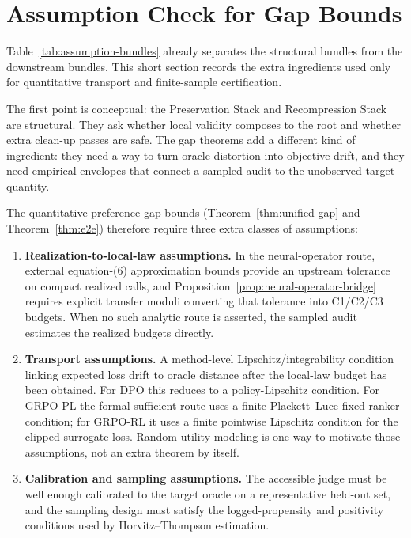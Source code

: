 \section{Assumption Check for Gap Bounds}\label{sec:verification}

Table~\ref{tab:assumption-bundles} already separates the structural bundles from the downstream bundles. This short section records the extra ingredients used only for quantitative transport and finite-sample certification.

The first point is conceptual: the Preservation Stack and Recompression Stack are structural. They ask whether local validity composes to the root and whether extra clean-up passes are safe. The gap theorems add a different kind of ingredient: they need a way to turn oracle distortion into objective drift, and they need empirical envelopes that connect a sampled audit to the unobserved target quantity.

The quantitative preference-gap bounds (Theorem~\ref{thm:unified-gap} and Theorem~\ref{thm:e2e}) therefore require three extra classes of assumptions:
\begin{enumerate}[leftmargin=1.5em]
    \item \textbf{Realization-to-local-law assumptions.} In the neural-operator route, external equation-(6) approximation bounds provide an upstream tolerance on compact realized calls, and Proposition~\ref{prop:neural-operator-bridge} requires explicit transfer moduli converting that tolerance into C1/C2/C3 budgets. When no such analytic route is asserted, the sampled audit estimates the realized budgets directly.
    \item \textbf{Transport assumptions.} A method-level Lipschitz/integrability condition linking expected loss drift to oracle distance after the local-law budget has been obtained. For DPO this reduces to a policy-Lipschitz condition. For GRPO-PL the formal sufficient route uses a finite Plackett--Luce fixed-ranker condition; for GRPO-RL it uses a finite pointwise Lipschitz condition for the clipped-surrogate loss. Random-utility modeling \citep{Schervish1995} is one way to motivate those assumptions, not an extra theorem by itself.
    \item \textbf{Calibration and sampling assumptions.} The accessible judge must be well enough calibrated to the target oracle on a representative held-out set, and the sampling design must satisfy the logged-propensity and positivity conditions used by Horvitz--Thompson estimation.
\end{enumerate}

